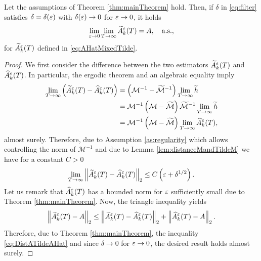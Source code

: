 \documentclass[10pt]{article}
\begin{document}
\begin{theorem}\label{thm:mainTheoremTilde} Let the assumptions of Theorem \ref{thm:mainTheorem} hold. Then, if $\delta$ in \eqref{eq:filter} satisfies $\delta = \delta(\varepsilon)$ with $\delta(\varepsilon) \to 0$ for $\varepsilon \to 0$, it holds
	\begin{equation}
		\lim_{\varepsilon \to 0} \lim_{T \to \infty} \widetilde A^\varepsilon_k(T) = A, \quad \text{a.s.},
	\end{equation} 
	for $\widetilde A^\varepsilon_k(T)$ defined in \eqref{eq:AHatMixedTilde}.
\end{theorem}
\begin{proof} We first consider the difference between the two estimators $\widetilde A^\varepsilon_k(T)$ and $\widehat A^\varepsilon_k(T)$. In particular, the ergodic theorem and an algebraic equality imply
	\begin{equation}
	\begin{aligned}
		\lim_{T \to \infty} \left(\widetilde A^\varepsilon_k(T) - \widehat A^\varepsilon_k(T)\right) &= \left(\mathcal M^{-1} - \widetilde{\mathcal M}^{-1}\right) \lim_{T \to \infty}\widetilde h \\
		&= \mathcal M^{-1}\left(\mathcal M - \widetilde{\mathcal M}\right)  \widetilde{\mathcal M}^{-1} \lim_{T \to \infty} \widetilde h\\
		&= \mathcal M^{-1}\left(\mathcal M - \widetilde{\mathcal M}\right)\lim_{T \to \infty} \widehat A^\varepsilon_k(T),
	\end{aligned}
	\end{equation}
	almost surely. Therefore, due to Assumption \ref{as:regularity} which allows controlling the norm of $\mathcal M^{-1}$ and due to Lemma \ref{lem:distanceMandTildeM} we have for a constant $C > 0$
	\begin{equation}\label{eq:DistATildeAHat}
		\lim_{T \to \infty} \left\|\widetilde A^\varepsilon_k(T) - \widehat A^\varepsilon_k(T)\right\|_2 \leq C \left(\varepsilon + \delta^{1/2} \right).
	\end{equation}
	Let us remark that $\widehat A^\varepsilon_k(T)$ has a bounded norm for $\varepsilon$ sufficiently small due to Theorem \ref{thm:mainTheorem}. Now, the triangle inequality yields
	\begin{equation}
		\left\|\widetilde A^\varepsilon_k(T) - A\right\|_2 \leq \left\|\widetilde A^\varepsilon_k(T) - \widehat A^\varepsilon_k(T)\right\|_2 + \left\|\widehat A^\varepsilon_k(T) - A\right\|_2.
	\end{equation}
	Therefore, due to Theorem \ref{thm:mainTheorem}, the inequality \eqref{eq:DistATildeAHat} and since $\delta \to 0$ for $\varepsilon \to 0$, the desired result holds almost surely.
\end{proof}
\end{document}
